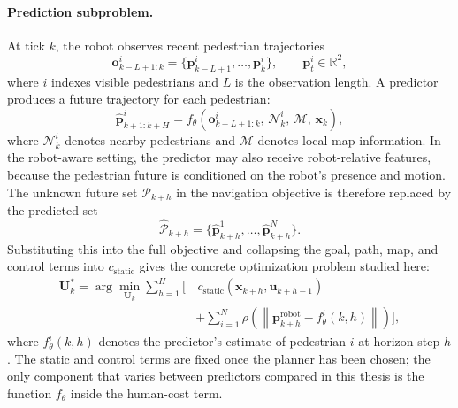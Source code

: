 \documentclass[12pt, a4paper]{article}
\begin{document}
\paragraph{Prediction subproblem.} At tick $k$, the robot observes recent pedestrian trajectories
\[
\mathbf{o}^{i}_{k-L+1:k}
=
\{\mathbf{p}^{i}_{k-L+1},\ldots,\mathbf{p}^{i}_{k}\},
\qquad
\mathbf{p}^{i}_{t}\in\mathbb{R}^{2},
\]
where $i$ indexes visible pedestrians and $L$ is the observation length. A predictor produces a future trajectory for each pedestrian:
\[
\hat{\mathbf{p}}^{i}_{k+1:k+H}
=
f_{\theta}\!\left(
\mathbf{o}^{i}_{k-L+1:k},\,
\mathcal{N}^{i}_{k},\,
\mathcal{M},\,
\mathbf{x}_{k}
\right),
\]
where $\mathcal{N}^{i}_{k}$ denotes nearby pedestrians and $\mathcal{M}$ denotes local map information. In the robot-aware setting, the predictor may also receive robot-relative features, because the pedestrian future is conditioned on the robot's presence and motion. The unknown future set $\mathcal{P}_{k+h}$ in the navigation objective is therefore replaced by the predicted set
\[
\hat{\mathcal{P}}_{k+h}
=
\{\hat{\mathbf{p}}^{1}_{k+h},\ldots,\hat{\mathbf{p}}^{N}_{k+h}\}.
\]
Substituting this into the full objective and collapsing the goal, path, map, and control terms into $c_{\mathrm{static}}$ gives the concrete optimization problem studied here:
\begin{align*}
\mathbf{U}^{*}_{k}
=
\arg\min_{\mathbf{U}_{k}}
\sum_{h=1}^{H}
\bigg[
&\,c_{\mathrm{static}}(\mathbf{x}_{k+h},\mathbf{u}_{k+h-1})\\
&+
\sum_{i=1}^{N}
\rho\!\left(
\left\|
\mathbf{p}^{\mathrm{robot}}_{k+h}
-
f_{\theta}^{i}(k,h)
\right\|
\right)
\bigg],
\end{align*}
where $f_{\theta}^{i}(k,h)$ denotes the predictor's estimate of pedestrian $i$ at horizon step $h$. The static and control terms are fixed once the planner has been chosen; the only component that varies between predictors compared in this thesis is the function $f_{\theta}$ inside the human-cost term.
\end{document}
